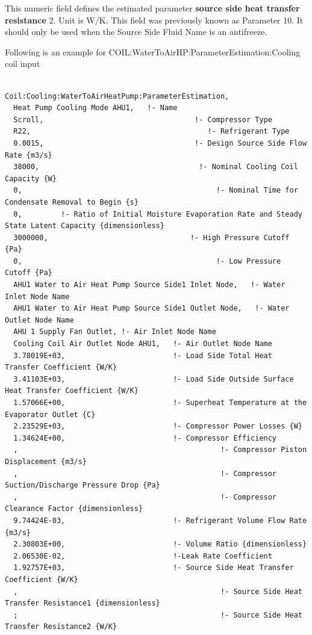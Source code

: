 This numeric field defines the estimated parameter \textbf{source side heat transfer resistance} 2. Unit is W/K. This field was previously known as Parameter 10. It should only be used when the Source Side Fluid Name is an antifreeze.

Following is an example for COIL:WaterToAirHP:ParameterEstimation:Cooling coil input

\begin{lstlisting}

Coil:Cooling:WaterToAirHeatPump:ParameterEstimation,
  Heat Pump Cooling Mode AHU1,   !- Name
  Scroll,                                   !- Compressor Type
  R22,                                         !- Refrigerant Type
  0.0015,                                   !- Design Source Side Flow Rate {m3/s}
  38000,                                     !- Nominal Cooling Coil Capacity {W}
  0,                                             !- Nominal Time for Condensate Removal to Begin {s}
  0,         !- Ratio of Initial Moisture Evaporation Rate and Steady State Latent Capacity {dimensionless}
  3000000,                                 !- High Pressure Cutoff {Pa}
  0,                                             !- Low Pressure Cutoff {Pa}
  AHU1 Water to Air Heat Pump Source Side1 Inlet Node,   !- Water Inlet Node Name
  AHU1 Water to Air Heat Pump Source Side1 Outlet Node,   !- Water Outlet Node Name
  AHU 1 Supply Fan Outlet, !- Air Inlet Node Name
  Cooling Coil Air Outlet Node AHU1,   !- Air Outlet Node Name
  3.78019E+03,                         !- Load Side Total Heat Transfer Coefficient {W/K}
  3.41103E+03,                         !- Load Side Outside Surface Heat Transfer Coefficient {W/K}
  1.57066E+00,                         !- Superheat Temperature at the Evaporator Outlet {C}
  2.23529E+03,                         !- Compressor Power Losses {W}
  1.34624E+00,                         !- Compressor Efficiency
  ,                                               !- Compressor Piston Displacement {m3/s}
  ,                                               !- Compressor Suction/Discharge Pressure Drop {Pa}
  ,                                               !- Compressor Clearance Factor {dimensionless}
  9.74424E-03,                         !- Refrigerant Volume Flow Rate {m3/s}
  2.30803E+00,                         !- Volume Ratio {dimensionless}
  2.06530E-02,                         !-Leak Rate Coefficient
  1.92757E+03,                         !- Source Side Heat Transfer Coefficient {W/K}
  ,                                               !- Source Side Heat Transfer Resistance1 {dimensionless}
  ;                                               !- Source Side Heat Transfer Resistance2 {W/K}
\end{lstlisting}


